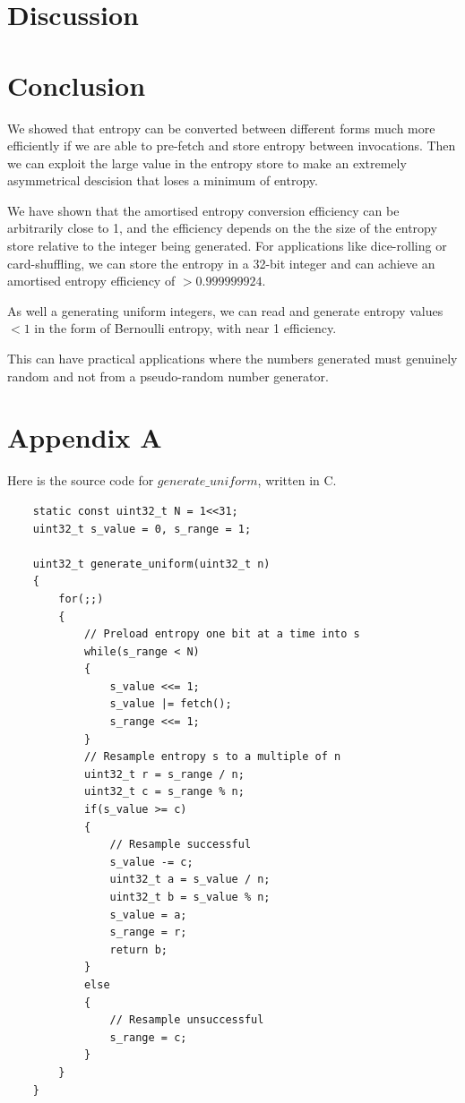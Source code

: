 \documentclass[12pt]{article}
\begin{document}
\section{Discussion}





\section{Conclusion}

We showed that entropy can be converted between different forms much more efficiently if we are able to pre-fetch and store entropy between invocations. Then we can exploit the large value in the entropy store to make an extremely asymmetrical descision that loses a minimum of entropy.

We have shown that the amortised entropy conversion efficiency can be arbitrarily close to 1, and the efficiency depends on the the size of the entropy store relative to the integer being generated. For applications like dice-rolling or card-shuffling, we can store the entropy in a 32-bit integer and can achieve an amortised entropy efficiency of $> 0.999999924$.

As well a generating uniform integers, we can read and generate entropy values $<1$ in the form of Bernoulli entropy, with near 1 efficiency.

This can have practical applications where the numbers generated must genuinely random and not from a pseudo-random number generator.

\printbibliography

\section {Appendix A}
Here is the source code for $generate\_uniform$, written in C.

\begin{verbatim}
    static const uint32_t N = 1<<31;
    uint32_t s_value = 0, s_range = 1;

    uint32_t generate_uniform(uint32_t n)
    {
        for(;;)
        {
            // Preload entropy one bit at a time into s
            while(s_range < N)
            {
                s_value <<= 1;
                s_value |= fetch();
                s_range <<= 1;
            }
            // Resample entropy s to a multiple of n
            uint32_t r = s_range / n;
            uint32_t c = s_range % n;
            if(s_value >= c)
            {
                // Resample successful
                s_value -= c;
                uint32_t a = s_value / n;
                uint32_t b = s_value % n;
                s_value = a;
                s_range = r; 
                return b;
            }
            else
            {
                // Resample unsuccessful
                s_range = c;
            }
        }
    }
\end{verbatim}
\end{document}
